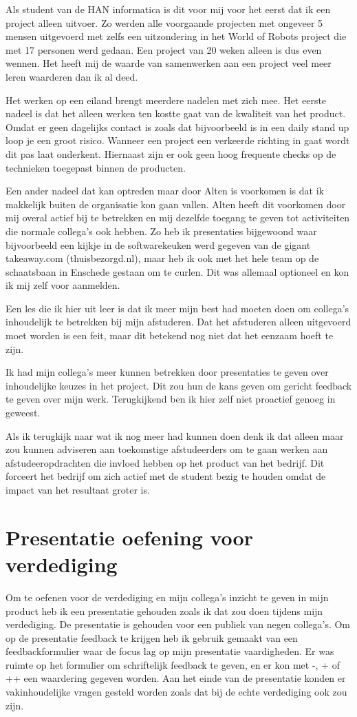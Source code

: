 \documentclass[a4paper, 11pt, oneside]{report}
\begin{document}
Als student van de HAN informatica is dit voor mij voor het eerst dat ik een project alleen uitvoer. 
Zo werden alle voorgaande projecten met ongeveer 5 mensen uitgevoerd met zelfs een uitzondering in het World of Robots project die met 17 personen werd gedaan.
Een project van 20 weken alleen is dus even wennen.
Het heeft mij de waarde van samenwerken aan een project veel meer leren waarderen dan ik al deed. 

Het werken op een eiland brengt meerdere nadelen met zich mee.
Het eerste nadeel is dat het alleen werken ten kostte gaat van de kwaliteit van het product.
Omdat er geen dagelijks contact is zoals dat bijvoorbeeld is in een daily stand up loop je een groot risico. Wanneer een project een verkeerde richting in gaat wordt dit pas laat onderkent. Hiernaast zijn er ook geen hoog frequente checks op de technieken toegepast binnen de producten.

Een ander nadeel dat kan optreden maar door Alten is voorkomen is dat ik makkelijk buiten de organisatie kon gaan vallen.
Alten heeft dit voorkomen door mij overal actief bij te betrekken en mij dezelfde toegang te geven tot activiteiten die normale collega's ook hebben. Zo heb ik presentaties bijgewoond waar bijvoorbeeld een kijkje in de softwarekeuken werd gegeven van de gigant takeaway.com (thuisbezorgd.nl), maar heb ik ook met het hele team op de schaatsbaan in Enschede gestaan om te curlen. Dit was allemaal optioneel en kon ik mij zelf voor aanmelden.

Een les die ik hier uit leer is dat ik meer mijn best had moeten doen om collega's inhoudelijk te betrekken bij mijn afstuderen. Dat het afstuderen alleen uitgevoerd moet worden is een feit, maar dit betekend nog niet dat het eenzaam hoeft te zijn.

Ik had mijn collega's meer kunnen betrekken door presentaties te geven over inhoudelijke keuzes in het project. Dit zou hun de kans geven om gericht feedback te geven over mijn werk. Terugkijkend ben ik hier zelf niet proactief genoeg in geweest.

Als ik terugkijk naar wat ik nog meer had kunnen doen denk ik dat alleen maar zou kunnen adviseren aan toekomstige afstudeerders om te gaan werken aan afstudeeropdrachten die invloed hebben op het product van het bedrijf. Dit forceert het bedrijf om zich actief met de student bezig te houden omdat de impact van het resultaat groter is. 

\section{Presentatie oefening voor verdediging}
Om te oefenen voor de verdediging en mijn collega's inzicht te geven in mijn product heb ik een presentatie gehouden zoals ik dat zou doen tijdens mijn verdediging.
De presentatie is gehouden voor een publiek van negen collega's.
Om op de presentatie feedback te krijgen heb ik gebruik gemaakt van een feedbackformulier waar de focus lag op mijn presentatie vaardigheden.
Er was ruimte op het formulier om schriftelijk feedback te geven, en er kon met -, + of ++ een waardering gegeven worden.
Aan het einde van de presentatie konden er vakinhoudelijke vragen gesteld worden zoals dat bij de echte verdediging ook zou zijn.
\end{document}
